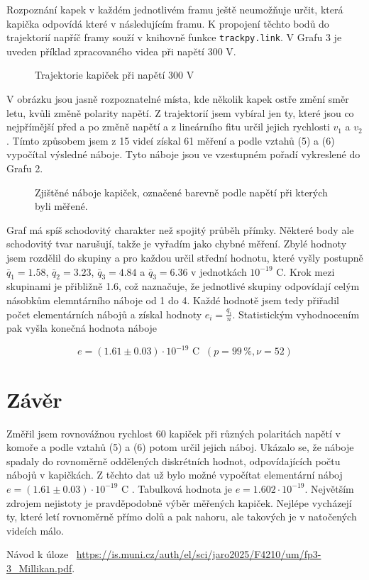 \documentclass[a4paper,11pt]{article}
\begin{document}
Rozpoznání kapek v každém jednotlivém framu ještě neumožňuje určit, která kapička odpovídá které v následujícím framu. K propojení těchto bodů do trajektorií napříč framy souží v knihovně funkce \texttt{trackpy.link}. V Grafu 3 je uveden příklad zpracovaného videa při napětí 300 V. 

\begin{figure}[htpb]
    \centering
    
    \captionsetup{type=graph}
    \caption{Trajektorie kapiček při napětí 300 V}
\end{figure}

V obrázku jsou jasně rozpoznatelné místa, kde několik kapek ostře změní směr letu, kvůli změně polarity napětí. Z trajektorií jsem vybíral jen ty, které jsou co nejpřímější před a po změně napětí a z lineárního fitu určil jejich rychlosti $ v_1 $ a $ v_2 $. Tímto způsobem jsem z 15 videí získal 61 měření a podle vztahů (5) a (6) vypočítal výsledné náboje. Tyto náboje jsou ve vzestupném pořadí vykreslené do Grafu 2.

\begin{figure}[htpb]
    \centering
    
    \captionsetup{type=graph}
    \caption{Zjištěné náboje kapiček, označené barevně podle napětí při kterých byli měřené.}
\end{figure}

Graf má spíš schodovitý charakter než spojitý průběh přímky. Některé body ale schodovitý tvar narušují, takže je vyřadím jako chybné měření. Zbylé hodnoty jsem rozdělil do skupiny a pro každou určil střední hodnotu, které vyšly postupně $ \bar{q}_1 = 1.58 $, $ \bar{q}_2 = 3.23 $, $ \bar{q}_3 = 4.84 $ a $ \bar{q}_3 = 6.36 $ v jednotkách $ 10 ^{-19} $ C. Krok mezi skupinami je přibližně 1.6, což naznačuje, že jednotlivé skupiny odpovídají celým násobkům elemntárního náboje od 1 do 4. Každé hodnotě jsem tedy přiřadil počet elementárních nábojů a získal hodnoty $ e_i = \frac{q_i}{n} $. Statistickým vyhodnocením pak vyšla konečná hodnota náboje

\begin{equation}
e = (1.61 \pm 0.03) \cdot 10^{-19} \text{ C } \ (p= 99\,\%, \nu= 52)
\end{equation}

\section{Závěr}

Změřil jsem rovnovážnou rychlost 60 kapiček při různých polaritách napětí v komoře a podle vztahů (5) a (6) potom určil jejich náboj. Ukázalo se, že náboje spadaly do rovnoměrně oddělených diskrétních hodnot, odpovídajících počtu nábojů v kapičkách. Z těchto dat už bylo možné vypočítat elementární náboj $ e = (1.61 \pm 0.03) \cdot 10^{-19} \text{ C } $. Tabulková hodnota je $ e = 1.602 \cdot 10 ^{-19} $. Největším zdrojem nejistoty je pravděpodobně výběr měřených kapiček. Nejlépe vycházejí ty, které letí rovnoměrně přímo dolů a pak nahoru, ale takových je v natočených videích málo. 

\begin{thebibliography}{0}
 Návod k úloze ~\url{https://is.muni.cz/auth/el/sci/jaro2025/F4210/um/fp3-3_Millikan.pdf}.   
\end{thebibliography}
\end{document}
